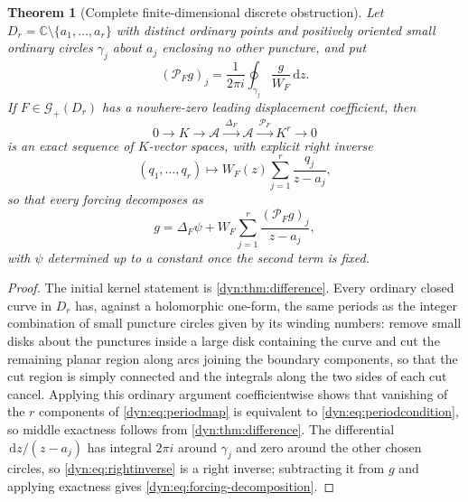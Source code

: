 \documentclass[11pt,letterpaper]{article}
\newtheorem{theorem}{Theorem}[section]
\theoremstyle{definition}
\theoremstyle{remark}
\newcommand{\C}{\mathbb C}
\newcommand{\GG}{\mathscr G}
\newcommand{\AAA}{\mathscr A}
\newcommand{\dd}{\,\mathrm d}
\numberwithin{equation}{section}
\begin{document}
\begin{theorem}[Complete finite-dimensional discrete obstruction]
\label{dyn:thm:exact-sequence}
Let $D_r=\C\setminus\{a_1,\dots,a_r\}$ with distinct ordinary points and
positively oriented small ordinary circles $\gamma_j$ about $a_j$ enclosing
no other puncture, and put
\begin{equation}\label{dyn:eq:periodmap}
 (\mathcal P_Fg)_j=\frac1{2\pi i}\oint_{\gamma_j}\frac{g}{W_F}\dd z .
\end{equation}
If $F\in\GG_+(D_r)$ has a nowhere-zero leading displacement coefficient,
then
\begin{equation}\label{dyn:eq:exact-sequence}
 0\longrightarrow K\longrightarrow\AAA
 \xrightarrow{\ \Delta_F\ }\AAA
 \xrightarrow{\ \mathcal P_F\ }K^{r}\longrightarrow0
\end{equation}
is an exact sequence of $K$-vector spaces, with explicit right inverse
\begin{equation}\label{dyn:eq:rightinverse}
 (q_1,\dots,q_r)\longmapsto W_F(z)\sum_{j=1}^{r}\frac{q_j}{z-a_j},
\end{equation}
so that every forcing decomposes as
\begin{equation}\label{dyn:eq:forcing-decomposition}
 g=\Delta_F\psi+W_F\sum_{j=1}^{r}\frac{(\mathcal P_Fg)_j}{z-a_j},
\end{equation}
with $\psi$ determined up to a constant once the second term is fixed.
\end{theorem}
\begin{proof}
The initial kernel statement is \cref{dyn:thm:difference}. Every ordinary
closed curve in $D_r$ has, against a holomorphic one-form, the same
periods as the integer combination of small puncture circles given by its
winding numbers: remove small disks about the punctures inside a large disk
containing the curve and cut the remaining planar region along arcs joining
the boundary components, so that the cut region is simply connected and the
integrals along the two sides of each cut cancel. Applying this ordinary
argument coefficientwise shows that vanishing of the $r$ components of
\eqref{dyn:eq:periodmap} is equivalent to
\eqref{dyn:eq:periodcondition}, so middle exactness follows from
\cref{dyn:thm:difference}. The differential $\dd z/(z-a_j)$ has integral
$2\pi i$ around $\gamma_j$ and zero around the other chosen circles, so
\eqref{dyn:eq:rightinverse} is a right inverse; subtracting it from $g$ and
applying exactness gives \eqref{dyn:eq:forcing-decomposition}.
\end{proof}
\end{document}
